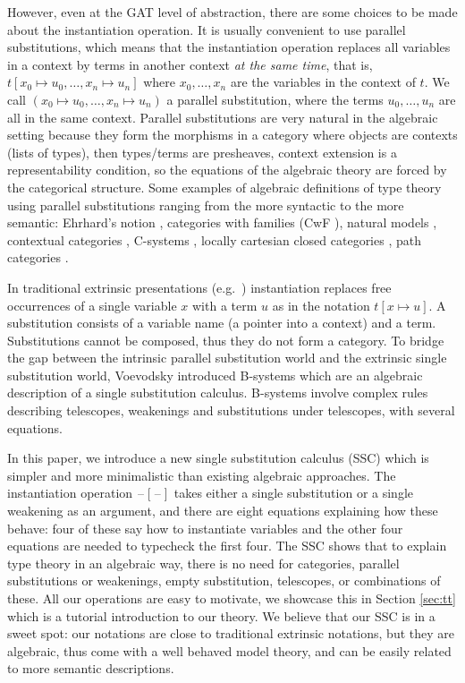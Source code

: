\documentclass[submission,copyright,creativecommons]{eptcs}
\newcommand{\blank}{\mathord{\hspace{1pt}\text{--}\hspace{1pt}}} %
\begin{document}
However, even at the GAT level of abstraction, there are some choices
to be made about the instantiation operation. It is usually convenient
to use parallel substitutions, which means that the instantiation
operation replaces all variables in a context by terms in another
context \emph{at the same time}, that is, $t[x_0\mapsto
  u_0,\dots,x_n\mapsto u_n]$ where $x_0,\dots,x_n$ are the variables
in the context of $t$. We call $(x_0\mapsto u_0,\dots,x_n\mapsto u_n)$
a parallel substitution, where the terms $u_0,\dots,u_n$ are
all in the same context. Parallel substitutions are very natural in
the algebraic setting because they form the morphisms in a category
where objects are contexts (lists of types), then types/terms are
presheaves, context extension is a representability condition, so the
equations of the algebraic theory are forced by the categorical
structure. Some examples of algebraic definitions of type theory using
parallel substitutions ranging from the more syntactic to the more
semantic: Ehrhard's notion \cite{ehrhard,coquandEhrhard}, categories
with families (CwF \cite{DBLP:conf/types/Dybjer95,Castellan2021}),
natural models \cite{DBLP:journals/mscs/Awodey18}, contextual
categories \cite{DBLP:journals/apal/Cartmell86}, C-systems
\cite{DBLP:journals/lmcs/AhrensLV18}, locally cartesian closed
categories \cite{DBLP:journals/mscs/ClairambaultD14}, path categories
\cite{DBLP:journals/tocl/Berg18}.

In traditional extrinsic presentations
(e.g.\ \cite{alti:phd93,DBLP:books/daglib/0005958}) instantiation
replaces free occurrences of a single variable $x$ with a term $u$ as
in the notation $t[x\mapsto u]$. A substitution consists of a
variable name (a pointer into a context) and a term. Substitutions
cannot be composed, thus they do not form a category. To bridge the
gap between the intrinsic parallel substitution world and the
extrinsic single substitution world, Voevodsky introduced B-systems
\cite{bc} which are an algebraic
description of a single substitution calculus. B-systems involve
complex rules describing telescopes, weakenings and substitutions
under telescopes, with several equations.

In this paper, we introduce a new single substitution calculus (SSC)
which is simpler and more minimalistic than existing algebraic
approaches. The instantiation operation $\blank[\blank]$ takes either a
single substitution or a single weakening as an argument, and there
are eight equations explaining how these behave: four of these say how
to instantiate variables and the other four equations are needed to
typecheck the first four. The SSC shows that to explain type theory in
an algebraic way, there is no need for categories, parallel
substitutions or weakenings, empty substitution, telescopes, or
combinations of these. All our operations are easy to motivate, we
showcase this in Section \ref{sec:tt} which is a tutorial introduction
to our theory. We believe that our SSC is in a sweet spot: our
notations are close to traditional extrinsic notations, but they are
algebraic, thus come with a well behaved model theory, and can be
easily related to more semantic descriptions.
\end{document}
